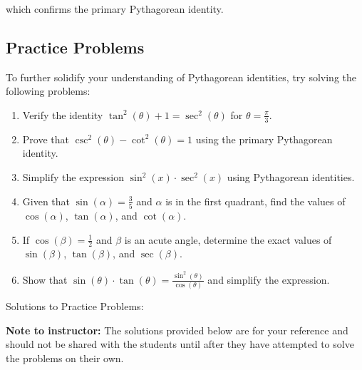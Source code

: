\documentclass[a4paper,12pt]{book}
\newcounter{problem}
\begin{document}
which confirms the primary Pythagorean identity.


\subsection{Practice Problems}
\label{subsec:pythagorean_practice_problems}

To further solidify your understanding of Pythagorean identities, try solving the following problems:

\begin{enumerate}
    \item Verify the identity $\tan^2(\theta) + 1 = \sec^2(\theta)$ for $\theta = \frac{\pi}{3}$.
    \item Prove that $\csc^2(\theta) - \cot^2(\theta) = 1$ using the primary Pythagorean identity.
    \item Simplify the expression $\sin^2(x) \cdot \sec^2(x)$ using Pythagorean identities.
    \item Given that $\sin(\alpha) = \frac{3}{5}$ and $\alpha$ is in the first quadrant, find the values of $\cos(\alpha)$, $\tan(\alpha)$, and $\cot(\alpha)$.
    \item If $\cos(\beta) = \frac{1}{2}$ and $\beta$ is an acute angle, determine the exact values of $\sin(\beta)$, $\tan(\beta)$, and $\sec(\beta)$.
    \item Show that $\sin(\theta) \cdot \tan(\theta) = \frac{\sin^2(\theta)}{\cos(\theta)}$ and simplify the expression.
\end{enumerate}

Solutions to Practice Problems:

\textbf{Note to instructor:} The solutions provided below are for your reference and should not be shared with the students until after they have attempted to solve the problems on their own.
\end{document}
